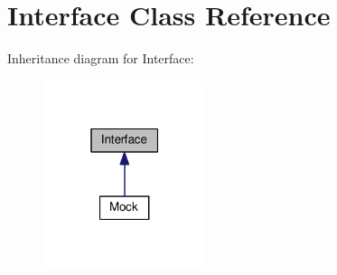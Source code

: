 \hypertarget{classInterface}{}\section{Interface Class Reference}
\label{classInterface}


Inheritance diagram for Interface\+:\nopagebreak
\begin{figure}[H]
\begin{center}
\leavevmode
\includegraphics[width=135pt]{classInterface__inherit__graph}
\end{center}
\end{figure}
